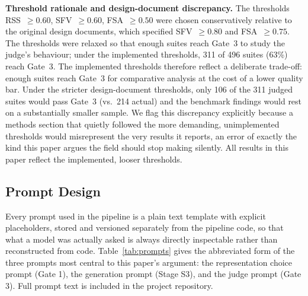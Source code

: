 \documentclass[conference]{IEEEtran}
\begin{document}
\textbf{Threshold rationale and design-document discrepancy.}
The thresholds RSS~$\geq 0.60$, SFV~$\geq 0.60$, FSA~$\geq 0.50$ were
chosen conservatively relative to the original design documents, which
specified SFV~$\geq 0.80$ and FSA~$\geq 0.75$. The thresholds were relaxed
so that enough suites reach Gate~3 to study the judge's behaviour; under the
implemented thresholds, 311 of 496 suites (63\%) reach Gate~3. The implemented thresholds therefore
reflect a deliberate trade-off: enough suites reach Gate~3 for comparative
analysis at the cost of a lower quality bar. Under the stricter
design-document thresholds, only 106 of the 311 judged suites would pass
Gate~3 (vs.\ 214 actual) and the benchmark findings would
rest on a substantially smaller sample. We flag this discrepancy explicitly
because a methods section that quietly followed the more demanding,
unimplemented thresholds would misrepresent the very results it reports,
an error of exactly the kind this paper argues the field should stop making
silently. All results in this paper reflect the implemented, looser
thresholds.

\subsection{Prompt Design}
\label{sec:prompts}
Every prompt used in the pipeline is a plain text template with explicit
placeholders, stored and versioned separately from the pipeline code, so that
what a model was actually asked is always directly inspectable rather than
reconstructed from code. Table~\ref{tab:prompts} gives the abbreviated form of
the three prompts most central to this paper's argument: the representation
choice prompt (Gate 1), the generation prompt (Stage S3), and the judge
prompt (Gate 3). Full prompt text is included in the project repository.
\end{document}

